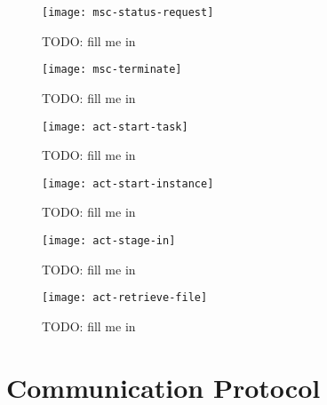 \begin{figure}
  \begin{center}
    \texttt{[image: msc-status-request]}
  \end{center}
  \caption[MSC Request Task Status]{TODO: fill me in}
  \label{fig:msc-status-request}
\end{figure}

\begin{figure}
  \begin{center}
    \texttt{[image: msc-terminate]}
  \end{center}
  \caption[MSC Terminate Task Request]{TODO: fill me in}
  \label{fig:msc-terminate}
\end{figure}

\begin{figure}
  \begin{center}
    \texttt{[image: act-start-task]}
  \end{center}
  \caption[Start Task Activity]{TODO: fill me in}
  \label{fig:act-start-task}
\end{figure}

\begin{figure}
  \begin{center}
    \texttt{[image: act-start-instance]}
  \end{center}
  \caption[Start Instance Activity]{TODO: fill me in}
  \label{fig:act-start-instance}
\end{figure}

\begin{figure}
  \begin{center}
    \texttt{[image: act-stage-in]}
  \end{center}
  \caption[Stage-In Activity]{TODO: fill me in}
  \label{fig:act-stage-in}
\end{figure}

\begin{figure}
  \begin{center}
    \texttt{[image: act-retrieve-file]}
  \end{center}
  \caption[File Retrieval Activity]{TODO: fill me in}
  \label{fig:act-retrieve-file}
\end{figure}


\section{Communication Protocol}
\label{cha:comm-prot}

